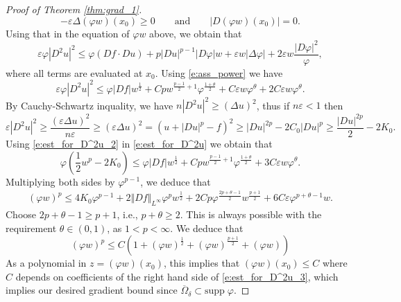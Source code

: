 \documentclass[11pt,reqno]{amsart}
\numberwithin{figure}{section}
\theoremstyle{plain}
\theoremstyle{remark}
\numberwithin{equation}{section}
\begin{document}
\begin{appendices}
\begin{proof}[Proof of Theorem \ref{thm:grad_1}]
\begin{equation*}
    -\varepsilon \Delta(\varphi w)(x_0)\geq 0 \qquad\text{and}\qquad |D(\varphi w)(x_0)| = 0.
\end{equation*}
Using that in the equation of $\varphi w$ above, we obtain that
\begin{equation*}
    \varepsilon \varphi|D^2u|^2 \leq  \varphi (Df\cdot Du)+ p|Du|^{p-1} |D\varphi|w + \varepsilon w |\Delta\varphi|  + 2\varepsilon  w\frac{|D\varphi|^2}{\varphi},
\end{equation*}
where all terms are evaluated at $x_0$. Using \eqref{e:ass_power} we have
\begin{equation}\label{e:est_for_D^2u}
    \varepsilon \varphi|D^2u|^2 \leq  \varphi |Df|w^{\frac{1}{2}}+ Cp w^{\frac{p-1}{2}+1} \varphi^{\frac{1+\theta}{2}} + C\varepsilon w \varphi^{\theta} + 2C\varepsilon  w\varphi^\theta.
\end{equation}
By Cauchy-Schwartz inquality, we have $n|D^2u|^2\geq (\Delta u)^2$, thus if $n\varepsilon < 1$ then
\begin{equation}\label{e:est_for_D^2u_2}
    \varepsilon |D^2u|^2 \geq \frac{(\varepsilon \Delta u)^2}{n\varepsilon} \geq (\varepsilon \Delta u)^2 = \left(  u + |Du|^p - f\right)^2 \geq |Du|^{2p} - 2C_0|Du|^p \geq \frac{|Du|^{2p}}{2} - 2K_0.
\end{equation}
Using \eqref{e:est_for_D^2u_2} in \eqref{e:est_for_D^2u} we obtain that
\begin{equation*}
    \varphi\left(\frac{1}{2}w^p - 2K_0\right) \leq \varphi |Df|w^{\frac{1}{2}}+ Cp w^{\frac{p-1}{2}+1} \varphi^{\frac{1+\theta}{2}} + 3C\varepsilon w \varphi^{\theta}.
\end{equation*}
Multiplying both sides by $\varphi^{p-1}$, we deduce that
\begin{align*}
    (\varphi w)^p \leq 4K_0\varphi^{p-1} + 2\Vert Df\Vert_{L^\infty}\varphi^p w^{\frac{1}{2}} + 2Cp \varphi^{\frac{2p+\theta - 1}{2}}w^{\frac{p+1}{2}} + 6C\varepsilon \varphi^{p+\theta - 1}w.
\end{align*}
Choose $2p+\theta -1 \geq p+1$, i.e., $p+\theta\geq 2$. This is always possible with the requirement $\theta \in (0,1)$, as $1<p <\infty$. We deduce that 
\begin{equation}\label{e:est_for_D^2u_3}
    (\varphi w)^p \leq C\left(1+ (\varphi w)^\frac{1}{2} + (\varphi w)^\frac{p+1}{2} +(\varphi w)\right)
\end{equation}
As a polynomial in $z = (\varphi w)(x_0)$, this implies that $(\varphi w)(x_0)\leq C$ where $C$ depends on coefficients of the right hand side of \eqref{e:est_for_D^2u_3}, which implies our desired gradient bound since $\overline{\Omega}_\delta\subset \mathrm{supp}\;\varphi$.
\end{proof}




\end{appendices}
\end{document}
